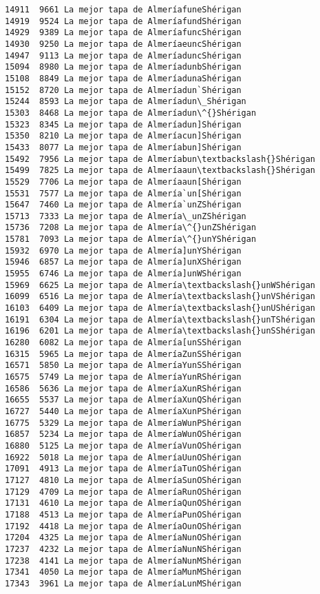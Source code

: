 \documentclass[11pt]{article}
\begin{document}
\begin{Verbatim}[commandchars=\\\{\}]
14911  9661 La mejor tapa de AlmeríafuneShérigan
14919  9524 La mejor tapa de AlmeríafundShérigan
14929  9389 La mejor tapa de AlmeríafuncShérigan
14930  9250 La mejor tapa de AlmeríaeuncShérigan
14947  9113 La mejor tapa de AlmeríaduncShérigan
15094  8980 La mejor tapa de AlmeríadunbShérigan
15108  8849 La mejor tapa de AlmeríadunaShérigan
15152  8720 La mejor tapa de Almeríadun`Shérigan
15244  8593 La mejor tapa de Almeríadun\_Shérigan
15303  8468 La mejor tapa de Almeríadun\^{}Shérigan
15323  8345 La mejor tapa de Almeríadun]Shérigan
15350  8210 La mejor tapa de Almeríacun]Shérigan
15433  8077 La mejor tapa de Almeríabun]Shérigan
15492  7956 La mejor tapa de Almeríabun\textbackslash{}Shérigan
15499  7825 La mejor tapa de Almeríaaun\textbackslash{}Shérigan
15529  7706 La mejor tapa de Almeríaaun[Shérigan
15531  7577 La mejor tapa de Almería`un[Shérigan
15647  7460 La mejor tapa de Almería`unZShérigan
15713  7333 La mejor tapa de Almería\_unZShérigan
15736  7208 La mejor tapa de Almería\^{}unZShérigan
15781  7093 La mejor tapa de Almería\^{}unYShérigan
15932  6970 La mejor tapa de Almería]unYShérigan
15946  6857 La mejor tapa de Almería]unXShérigan
15955  6746 La mejor tapa de Almería]unWShérigan
15969  6625 La mejor tapa de Almería\textbackslash{}unWShérigan
16099  6516 La mejor tapa de Almería\textbackslash{}unVShérigan
16103  6409 La mejor tapa de Almería\textbackslash{}unUShérigan
16191  6304 La mejor tapa de Almería\textbackslash{}unTShérigan
16196  6201 La mejor tapa de Almería\textbackslash{}unSShérigan
16280  6082 La mejor tapa de Almería[unSShérigan
16315  5965 La mejor tapa de AlmeríaZunSShérigan
16571  5850 La mejor tapa de AlmeríaYunSShérigan
16575  5749 La mejor tapa de AlmeríaYunRShérigan
16586  5636 La mejor tapa de AlmeríaXunRShérigan
16655  5537 La mejor tapa de AlmeríaXunQShérigan
16727  5440 La mejor tapa de AlmeríaXunPShérigan
16775  5329 La mejor tapa de AlmeríaWunPShérigan
16857  5234 La mejor tapa de AlmeríaWunOShérigan
16880  5125 La mejor tapa de AlmeríaVunOShérigan
16922  5018 La mejor tapa de AlmeríaUunOShérigan
17091  4913 La mejor tapa de AlmeríaTunOShérigan
17127  4810 La mejor tapa de AlmeríaSunOShérigan
17129  4709 La mejor tapa de AlmeríaRunOShérigan
17131  4610 La mejor tapa de AlmeríaQunOShérigan
17188  4513 La mejor tapa de AlmeríaPunOShérigan
17192  4418 La mejor tapa de AlmeríaOunOShérigan
17204  4325 La mejor tapa de AlmeríaNunOShérigan
17237  4232 La mejor tapa de AlmeríaNunNShérigan
17238  4141 La mejor tapa de AlmeríaNunMShérigan
17341  4050 La mejor tapa de AlmeríaMunMShérigan
17343  3961 La mejor tapa de AlmeríaLunMShérigan

\end{Verbatim}
\end{document}

